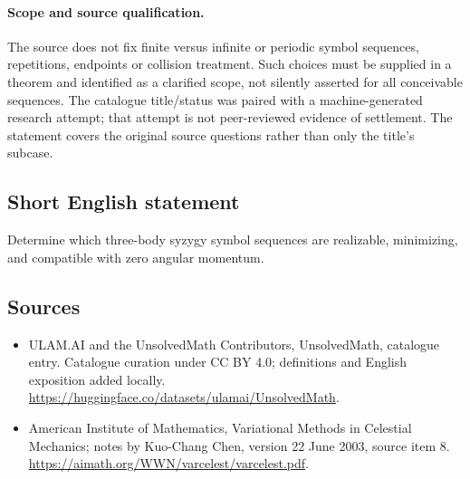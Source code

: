 \documentclass[11pt]{article}
\begin{document}
\paragraph{Scope and source qualification.}The source does not fix finite versus infinite or periodic symbol sequences, repetitions, endpoints or collision treatment. Such choices must be supplied in a theorem and identified as a clarified scope, not silently asserted for all conceivable sequences. The catalogue title/status was paired with a machine-generated research attempt; that attempt is not peer-reviewed evidence of settlement. The statement covers the original source questions rather than only the title’s subcase.
\subsection{Short English statement}
Determine which three-body syzygy symbol sequences are realizable, minimizing, and compatible with zero angular momentum.
\subsection{Sources}
\begin{itemize}
\item[\hypertarget{source:statement:1}{S1}] ULAM.AI and the UnsolvedMath Contributors, UnsolvedMath, catalogue entry. Catalogue curation under CC BY 4.0; definitions and English exposition added locally.
\url{https://huggingface.co/datasets/ulamai/UnsolvedMath}.
\item[\hypertarget{source:statement:2}{S2}] American Institute of Mathematics, Variational Methods in Celestial Mechanics; notes by Kuo-Chang Chen, version 22 June 2003, source item 8.
\url{https://aimath.org/WWN/varcelest/varcelest.pdf}.
\end{itemize}
\label{end:statement}
\end{document}
